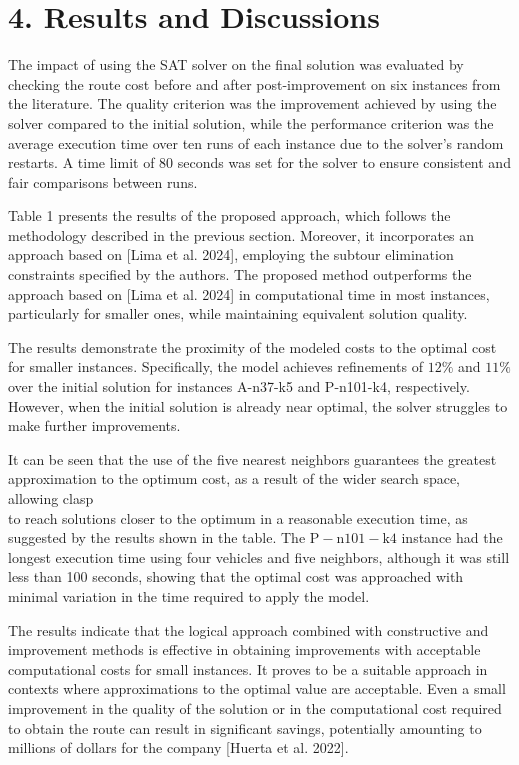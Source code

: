 \documentclass[10pt]{article}
\begin{document}
\section*{4. Results and Discussions}
The impact of using the SAT solver on the final solution was evaluated by checking the route cost before and after post-improvement on six instances from the literature. The quality criterion was the improvement achieved by using the solver compared to the initial solution, while the performance criterion was the average execution time over ten runs of each instance due to the solver's random restarts. A time limit of 80 seconds was set for the solver to ensure consistent and fair comparisons between runs.

Table 1 presents the results of the proposed approach, which follows the methodology described in the previous section. Moreover, it incorporates an approach based on [Lima et al. 2024], employing the subtour elimination constraints specified by the authors. The proposed method outperforms the approach based on [Lima et al. 2024] in computational time in most instances, particularly for smaller ones, while maintaining equivalent solution quality.

The results demonstrate the proximity of the modeled costs to the optimal cost for smaller instances. Specifically, the model achieves refinements of $12 \%$ and $11 \%$ over the initial solution for instances A-n37-k5 and P-n101-k4, respectively. However, when the initial solution is already near optimal, the solver struggles to make further improvements.

It can be seen that the use of the five nearest neighbors guarantees the greatest approximation to the optimum cost, as a result of the wider search space, allowing clasp\\
to reach solutions closer to the optimum in a reasonable execution time, as suggested by the results shown in the table. The $\mathrm{P}-\mathrm{n} 101-\mathrm{k} 4$ instance had the longest execution time using four vehicles and five neighbors, although it was still less than 100 seconds, showing that the optimal cost was approached with minimal variation in the time required to apply the model.

The results indicate that the logical approach combined with constructive and improvement methods is effective in obtaining improvements with acceptable computational costs for small instances. It proves to be a suitable approach in contexts where approximations to the optimal value are acceptable. Even a small improvement in the quality of the solution or in the computational cost required to obtain the route can result in significant savings, potentially amounting to millions of dollars for the company [Huerta et al. 2022].
\end{document}
